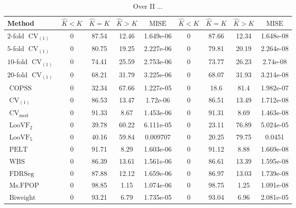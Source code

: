 \begin{table}[ht]
\centering
\begin{tabular}{|l|cccc|cccc|}
  \hline
Method & $\hat{K} < K$ & $\hat{K} = K$ & $\hat{K} > K$ & $\operatorname{MISE}$ & $\hat{K} < K$ & $\hat{K} = K$ & $\hat{K} > K$ & $\operatorname{MISE}$ \\ 
  \hline
$2$-fold $\operatorname{CV}_{(1)}$ &     0 & 87.54 & 12.46 & 1.649e-06 &     0 & 87.66 & 12.34 & 1.648e-08 \\ 
  $5$-fold $\operatorname{CV}_{(1)}$ &     0 & 80.75 & 19.25 & 2.227e-06 &     0 & 79.81 & 20.19 & 2.264e-08 \\ 
  $10$-fold $\operatorname{CV}_{(1)}$ &     0 & 74.41 & 25.59 & 2.753e-06 &     0 & 73.77 & 26.23 & 2.74e-08 \\ 
  $20$-fold $\operatorname{CV}_{(1)}$ &     0 & 68.21 & 31.79 & 3.225e-06 &     0 & 68.07 & 31.93 & 3.214e-08 \\ 
  $\operatorname{COPSS}$ &     0 & 32.34 & 67.66 & 1.227e-05 &     0 &  18.6 &  81.4 & 1.982e-07 \\ 
  $\operatorname{CV}_{(1)}$ &     0 & 86.53 & 13.47 & 1.72e-06 &     0 & 86.51 & 13.49 & 1.712e-08 \\ 
  $\operatorname{CV}_{\operatorname{mod}}$ &     0 & 91.33 &  8.67 & 1.453e-06 &     0 & 91.31 &  8.69 & 1.463e-08 \\ 
  $\operatorname{LooVF}_2$ &     0 & 39.78 & 60.22 & 6.111e-05 &     0 & 23.11 & 76.89 & 5.024e-05 \\ 
  $\operatorname{LooVF}_5$ &     0 & 40.16 & 59.84 & 0.009707 &     0 & 20.25 & 79.75 & 0.0451 \\ 
  $\operatorname{PELT}$ &     0 & 91.71 &  8.29 & 1.603e-06 &     0 & 91.12 &  8.88 & 1.669e-08 \\ 
  $\operatorname{WBS}$ &     0 & 86.39 & 13.61 & 1.561e-06 &     0 & 86.61 & 13.39 & 1.595e-08 \\ 
  $\operatorname{FDRSeg}$ &     0 & 87.88 & 12.12 & 1.659e-06 &     0 & 86.97 & 13.03 & 1.739e-08 \\ 
  $\operatorname{Ms.FPOP}$ &     0 & 98.85 &  1.15 & 1.074e-06 &     0 & 98.75 &  1.25 & 1.091e-08 \\ 
  $\operatorname{Biweight}$ &     0 & 93.21 &  6.79 & 1.735e-05 &     0 & 93.04 &  6.96 & 2.081e-05 \\ 
   \hline
\end{tabular}
\caption{Over II ...} 
\end{table}
